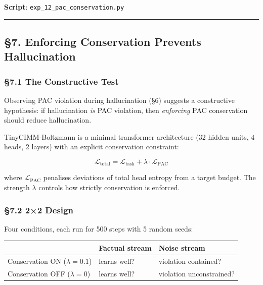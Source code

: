 \documentclass[
  11pt,
  a4paper]{article}
\begin{document}
\textbf{Script}: \texttt{exp\_12\_pac\_conservation.py}

\begin{center}\rule{0.5\linewidth}{0.5pt}\end{center}

\subsection{§7. Enforcing Conservation Prevents
Hallucination}\label{enforcing-conservation-prevents-hallucination}

\subsubsection{§7.1 The Constructive Test}\label{the-constructive-test}

Observing PAC violation during hallucination (§6) suggests a
constructive hypothesis: if hallucination \emph{is} PAC violation, then
\emph{enforcing} PAC conservation should reduce hallucination.

TinyCIMM-Boltzmann is a minimal transformer architecture (32 hidden
units, 4 heads, 2 layers) with an explicit conservation constraint:

\[\mathcal{L}_\text{total} = \mathcal{L}_\text{task} + \lambda \cdot \mathcal{L}_\text{PAC}\]

where \(\mathcal{L}_\text{PAC}\) penalises deviations of total head
entropy from a target budget. The strength \(\lambda\) controls how
strictly conservation is enforced.

\subsubsection{§7.2 2×2 Design}\label{design}

Four conditions, each run for 500 steps with 5 random seeds:

\begin{longtable}[]{@{}
  >{\raggedright\arraybackslash}p{}
  >{\raggedright\arraybackslash}p{}
  >{\raggedright\arraybackslash}p{}@{}}
\toprule\noalign{}
\begin{minipage}[b]{\linewidth}\raggedright
\end{minipage} & \begin{minipage}[b]{\linewidth}\raggedright
Factual stream
\end{minipage} & \begin{minipage}[b]{\linewidth}\raggedright
Noise stream
\end{minipage} \\
\midrule\noalign{}
\endhead
\bottomrule\noalign{}
\endlastfoot
Conservation ON (\(\lambda = 0.1\)) & learns well? & violation
contained? \\
Conservation OFF (\(\lambda = 0\)) & learns well? & violation
unconstrained? \\
\end{longtable}
\end{document}
